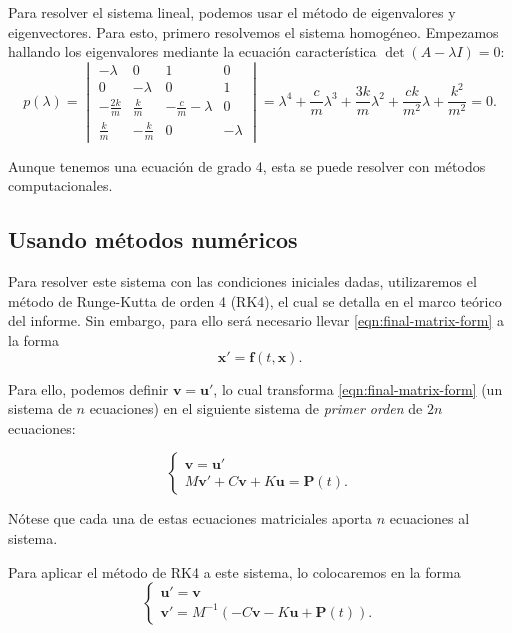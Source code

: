 Para resolver el sistema lineal, podemos usar el método de eigenvalores y eigenvectores. Para esto, primero resolvemos el sistema homogéneo. Empezamos hallando los eigenvalores mediante la ecuación característica \(\det(A-\lambda I) = 0\):
\[
	p(\lambda ) = \begin{vmatrix}
        -\lambda & 0 & 1 & 0 \\
        0 & -\lambda & 0 & 1 \\
        -\frac{2k}{m} & \frac{k}{m} & -\frac{c}{m}-\lambda & 0 \\
        \frac{k}{m} & -\frac{k}{m} & 0 & -\lambda
   \end{vmatrix}
   = \lambda^4 + \frac{c}{m}\lambda^3 + \frac{3k}{m}\lambda^2 + \frac{ck}{m^2}\lambda + \frac{k^2}{m^2}
   = 0
.\]

Aunque tenemos una ecuación de grado 4, esta se puede resolver con métodos computacionales.

\subsection{Usando métodos numéricos}

Para resolver este sistema con las condiciones iniciales dadas, utilizaremos el método de Runge-Kutta de orden 4 (RK4), el cual se detalla en el marco teórico del informe. Sin embargo, para ello será necesario llevar \eqref{eqn:final-matrix-form} a la forma
\[
    \mathbf{x}' = \mathbf{f}(t, \mathbf{x})
.\]

Para ello, podemos definir \(\mathbf{v} = \mathbf{u}'\), lo cual transforma \eqref{eqn:final-matrix-form} (un sistema de \(n\) ecuaciones) en el siguiente sistema de \textit{primer orden} de \(2n\) ecuaciones:

\[
    \begin{cases}
        \mathbf{v} = \mathbf{u}' \\
        M\mathbf{v}' + C\mathbf{v} + K\mathbf{u} = \mathbf{P}(t)
    .\end{cases}
\]

Nótese que cada una de estas ecuaciones matriciales aporta \(n\) ecuaciones al sistema.

Para aplicar el método de RK4 a este sistema, lo colocaremos en la forma
\begin{equation}\label{eqn:substituted-system}
    \begin{cases}
        \mathbf{u}' = \mathbf{v} \\
        \mathbf{v}' = M^{-1}(-C\mathbf{v} - K\mathbf{u} + \mathbf{P}(t))
    .\end{cases}
\end{equation}


